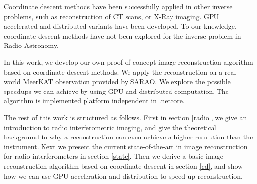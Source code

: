 Coordinate descent methods have been successfully applied in other inverse problems, such as reconstruction of CT scans\cite{bouman1996unified}, or X-Ray imaging\cite{felix2017compressed}. GPU accelerated\cite{mcgaffin2015edge} and distributed\cite{fercoq2014fast} variants have been developed. To our knowledge, coordinate descent methods have not been explored for the inverse problem in Radio Astronomy.

In this work, we develop our own proof-of-concept image reconstruction algorithm based on coordinate descent methods. We apply the reconstruction on a real world MeerKAT observation provided by SARAO. We explore the possible speedups we can achieve by using GPU and distributed computation. The algorithm is implemented platform independent in .netcore.


The rest of this work is structured as follows. First in section \ref{radio}, we give an introduction to radio interferometric imaging, and give the theoretical background to why a reconstruction can even achieve a higher resolution than the instrument. Next we present the current state-of-the-art in image reconstruction for radio interferometers in section \ref{state}. Then we derive a basic image reconstruction algorithm based on coordinate descent in section \ref{cd}, and show how we can use GPU acceleration and distribution to speed up reconstruction.

